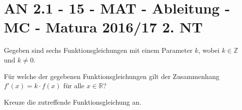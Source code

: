 \section{AN 2.1 - 15 - MAT - Ableitung - MC - Matura 2016/17 2. NT}

\begin{beispiel}{1} %
Gegeben sind sechs Funktionsgleichungen mit einem Parameter $k$, wobei $k \in \mathbb Z$ und $k \neq 0$.

Für welche der gegebenen Funktionsgleichungen gilt der Zusammenhang $f'(x)=k\cdot f(x)$ für alle $x \in \mathbb R$?

Kreuze die zutreffende Funktionsgleichung an.

\end{beispiel}